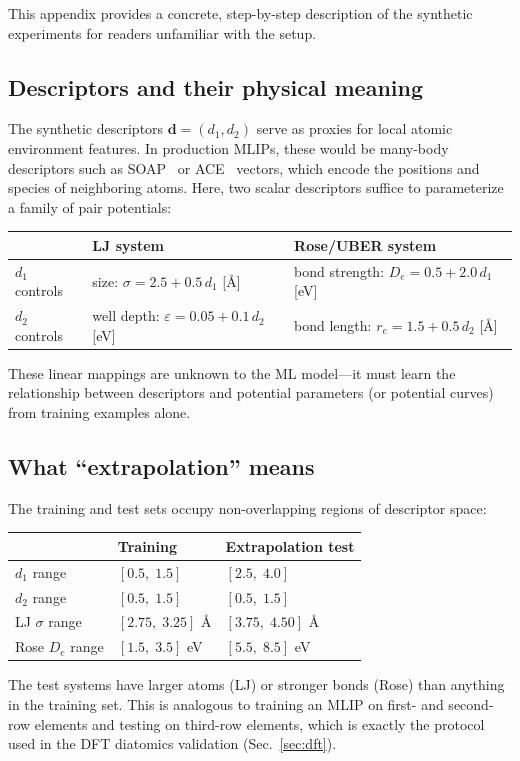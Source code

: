 \documentclass[aps,prb,twocolumn,superscriptaddress,longbibliography,floatfix]{revtex4-2}
\begin{document}
This appendix provides a concrete, step-by-step description of the synthetic experiments for readers unfamiliar with the setup.

\subsection{Descriptors and their physical meaning}

The synthetic descriptors $\mathbf{d} = (d_1, d_2)$ serve as proxies for local atomic environment features. In production MLIPs, these would be many-body descriptors such as SOAP~\cite{Bartok2010} or ACE~\cite{Drautz2019} vectors, which encode the positions and species of neighboring atoms. Here, two scalar descriptors suffice to parameterize a family of pair potentials:
\begin{center}
\begin{tabular}{lll}
  \toprule
  & LJ system & Rose/UBER system \\
  \midrule
  $d_1$ controls & size: $\sigma = 2.5 + 0.5\,d_1$ [\AA] & bond strength: $D_e = 0.5 + 2.0\,d_1$ [eV] \\
  $d_2$ controls & well depth: $\varepsilon = 0.05 + 0.1\,d_2$ [eV] & bond length: $r_e = 1.5 + 0.5\,d_2$ [\AA] \\
  \bottomrule
\end{tabular}
\end{center}
These linear mappings are unknown to the ML model---it must learn the relationship between descriptors and potential parameters (or potential curves) from training examples alone.

\subsection{What ``extrapolation'' means}

The training and test sets occupy non-overlapping regions of descriptor space:
\begin{center}
\begin{tabular}{lll}
  \toprule
  & Training & Extrapolation test \\
  \midrule
  $d_1$ range & $[0.5,\; 1.5]$ & $[2.5,\; 4.0]$ \\
  $d_2$ range & $[0.5,\; 1.5]$ & $[0.5,\; 1.5]$ \\
  LJ $\sigma$ range & $[2.75,\; 3.25]$ \AA & $[3.75,\; 4.50]$ \AA \\
  Rose $D_e$ range & $[1.5,\; 3.5]$ eV & $[5.5,\; 8.5]$ eV \\
  \bottomrule
\end{tabular}
\end{center}
The test systems have larger atoms (LJ) or stronger bonds (Rose) than anything in the training set. This is analogous to training an MLIP on first- and second-row elements and testing on third-row elements, which is exactly the protocol used in the DFT diatomics validation (Sec.~\ref{sec:dft}).
\end{document}
